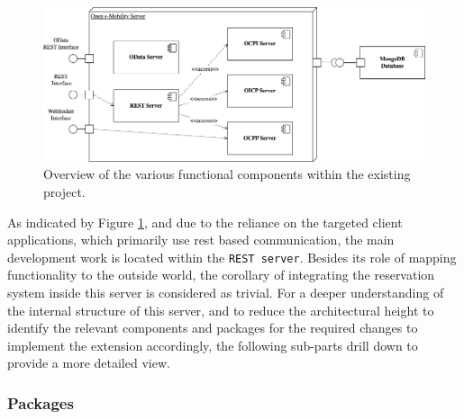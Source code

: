\begin{figure}[h]
    \centering
    \includegraphics[scale=0.4]{resources/images/main/6_implementation/DeploymentView.png}
    \caption{Overview of the various functional components within the existing project.}
    \label{fig:module-view}
\end{figure}

\noindent As indicated by Figure \ref{fig:module-view}, and due to the reliance on the targeted client applications, which primarily use \acrshort{rest} based communication, the main development work is located within the \texttt{REST server}. 
Besides its role of mapping functionality to the outside world, the corollary of integrating the reservation system inside this server is considered as trivial.
For a deeper understanding of the internal structure of this server, and to reduce the architectural height to identify the relevant components and packages for the required changes to implement the extension accordingly, the following sub-parts drill down to provide a more detailed view.

\subsubsection{Packages}
\label{ch:Implementation:sec:Reservation System:ssec:Architectural Views:sssec:Packages}

